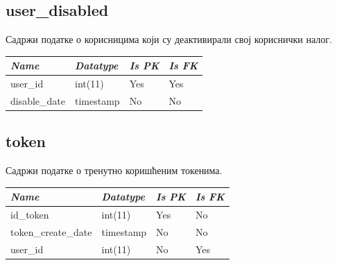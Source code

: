 \subsection{user\_disabled}
Садржи податке о корисницима који су деактивирали свој кориснички налог.

\begin{table}[h!]
\centering
\small

    \begin{tabular}{ | m{} | m{} | m{} | m{} | }
    \hline
        \cellcolor{blue!25}\textbf{\textit{Name}} &

        \cellcolor{blue!25}\textbf{\textit{Datatype}} &
        \cellcolor{blue!25}\textbf{\textit{Is PK}} &
        \cellcolor{blue!25}\textbf{\textit{Is FK}} \\
    \hline
    \hline
        user\_id & int(11) & Yes & Yes \\
    \hline
        disable\_date & timestamp & No & No \\
    \hline
    \end{tabular}

\end{table}

\subsection{token}
Садржи податке о тренутно коришћеним токенима.

\begin{table}[h!]
\centering
\small

    \begin{tabular}{ | m{} | m{} | m{} | m{} | }
    \hline
        \cellcolor{blue!25}\textbf{\textit{Name}} &

        \cellcolor{blue!25}\textbf{\textit{Datatype}} &
        \cellcolor{blue!25}\textbf{\textit{Is PK}} &
        \cellcolor{blue!25}\textbf{\textit{Is FK}} \\
    \hline
    \hline
        id\_token & int(11) & Yes & No \\
    \hline
        token\_create\_date & timestamp & No & No \\
    \hline
        user\_id & int(11) & No & Yes \\
    \hline
    \end{tabular}

\end{table}

